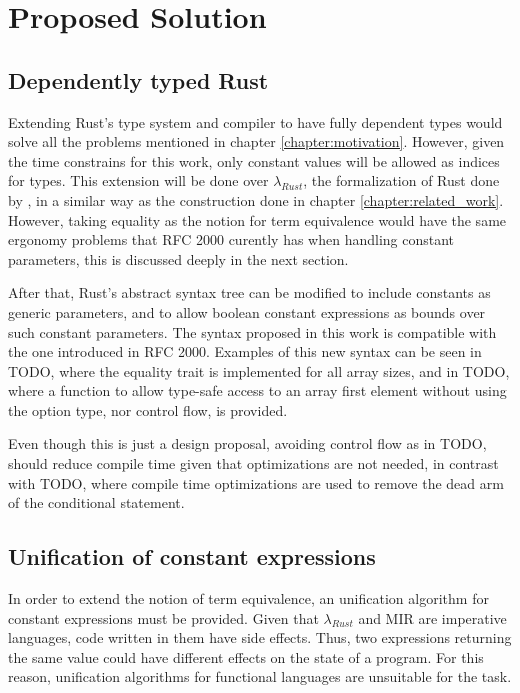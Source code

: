 \chapter{Proposed Solution}
\label{chapter:proposed_solution}

\section{Dependently typed Rust}

Extending Rust's type system and compiler to have fully dependent types would
solve all the problems mentioned in chapter \ref{chapter:motivation}. However,
given the time constrains for this work, only constant values will be allowed as
indices for types. This extension will be done over $\lambda_{Rust}$, the
formalization of Rust done by \citet{ralf}, in a similar way as the construction
done in chapter \ref{chapter:related_work}. However, taking equality as the
notion for term equivalence would have the same ergonomy problems that RFC 2000
curently has when handling constant parameters, this is discussed deeply in the
next section.

After that, Rust's abstract syntax tree can be modified to include constants as
generic parameters, and to allow boolean constant expressions as bounds over
such constant parameters. The syntax proposed in this work is compatible with
the one introduced in RFC 2000. Examples of this new syntax can be seen in TODO,
where the equality trait is implemented for all array sizes, and in TODO, where
a function to allow type-safe access to an array first element without using the
option type, nor control flow, is provided. 

Even though this is just a design proposal, avoiding control flow as in TODO,
should reduce compile time given that optimizations are not needed, in contrast
with TODO, where compile time optimizations are used to remove the dead arm of
the conditional statement.

\section{Unification of constant expressions}

In order to extend the notion of term equivalence, an unification algorithm for
constant expressions must be provided. Given that $\lambda_{Rust}$ and MIR are
imperative languages, code written in them have side effects. Thus, two
expressions returning the same value could have different effects on the state
of a program.  For this reason, unification algorithms for functional languages
are unsuitable for the task. 

